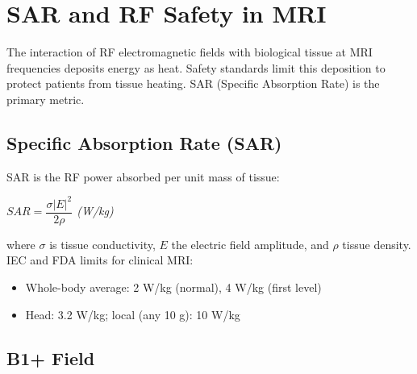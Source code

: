 \section{SAR and RF Safety in MRI}\label{sec:wiki_sar}



The interaction of RF electromagnetic fields with biological tissue at MRI frequencies deposits energy as heat. Safety standards limit this deposition to protect patients from tissue heating. SAR (Specific Absorption Rate) is the primary metric.

				

\subsection{Specific Absorption Rate (SAR)}

				

SAR is the RF power absorbed per unit mass of tissue:


				

\noindent\hspace*{1.2em}\textit{$SAR = \dfrac{\sigma |E|^2}{2\rho}$   (W/kg)}

				

where $\sigma$ is tissue conductivity, $E$ the electric field amplitude, and $\rho$ tissue density. IEC and FDA limits for clinical MRI:

				
\begin{itemize}

					\item Whole-body average: 2 W/kg (normal), 4 W/kg (first level)

					\item Head: 3.2 W/kg; local (any 10 g): 10 W/kg

				
\end{itemize}

				

\subsection{B1+ Field}

				



